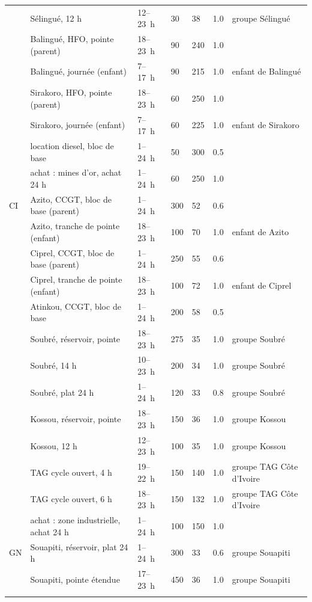 \begin{longtable}{p{1.0cm}p{5.4cm}p{1.6cm}p{1.5cm}p{1.7cm}p{0.9cm}p{2.7cm}}
 & Sélingué, 12 h & 12--23~h & 30 & 38 & 1.0 & groupe Sélingué \\ \rowsep
 & Balingué, HFO, pointe (parent) & 18--23~h & 90 & 240 & 1.0 &  \\ \rowsep
 & Balingué, journée (enfant) & 7--17~h & 90 & 215 & 1.0 & enfant de Balingué \\ \rowsep
 & Sirakoro, HFO, pointe (parent) & 18--23~h & 60 & 250 & 1.0 &  \\ \rowsep
 & Sirakoro, journée (enfant) & 7--17~h & 60 & 225 & 1.0 & enfant de Sirakoro \\ \rowsep
 & location diesel, bloc de base & 1--24~h & 50 & 300 & 0.5 &  \\ \rowsep
 & achat : mines d'or, achat 24 h & 1--24~h & 60 & 250 & 1.0 &  \\ \rowsep
CI & Azito, CCGT, bloc de base (parent) & 1--24~h & 300 & 52 & 0.6 &  \\ \rowsep
 & Azito, tranche de pointe (enfant) & 18--23~h & 100 & 70 & 1.0 & enfant de Azito \\ \rowsep
 & Ciprel, CCGT, bloc de base (parent) & 1--24~h & 250 & 55 & 0.6 &  \\ \rowsep
 & Ciprel, tranche de pointe (enfant) & 18--23~h & 100 & 72 & 1.0 & enfant de Ciprel \\ \rowsep
 & Atinkou, CCGT, bloc de base & 1--24~h & 200 & 58 & 0.5 &  \\ \rowsep
 & Soubré, réservoir, pointe & 18--23~h & 275 & 35 & 1.0 & groupe Soubré \\ \rowsep
 & Soubré, 14 h & 10--23~h & 200 & 34 & 1.0 & groupe Soubré \\ \rowsep
 & Soubré, plat 24 h & 1--24~h & 120 & 33 & 0.8 & groupe Soubré \\ \rowsep
 & Kossou, réservoir, pointe & 18--23~h & 150 & 36 & 1.0 & groupe Kossou \\ \rowsep
 & Kossou, 12 h & 12--23~h & 100 & 35 & 1.0 & groupe Kossou \\ \rowsep
 & TAG cycle ouvert, 4 h & 19--22~h & 150 & 140 & 1.0 & groupe TAG Côte d'Ivoire \\ \rowsep
 & TAG cycle ouvert, 6 h & 18--23~h & 150 & 132 & 1.0 & groupe TAG Côte d'Ivoire \\ \rowsep
 & achat : zone industrielle, achat 24 h & 1--24~h & 100 & 150 & 1.0 &  \\ \rowsep
GN & Souapiti, réservoir, plat 24 h & 1--24~h & 300 & 33 & 0.6 & groupe Souapiti \\ \rowsep
 & Souapiti, pointe étendue & 17--23~h & 450 & 36 & 1.0 & groupe Souapiti \\ \rowsep

\end{longtable}
